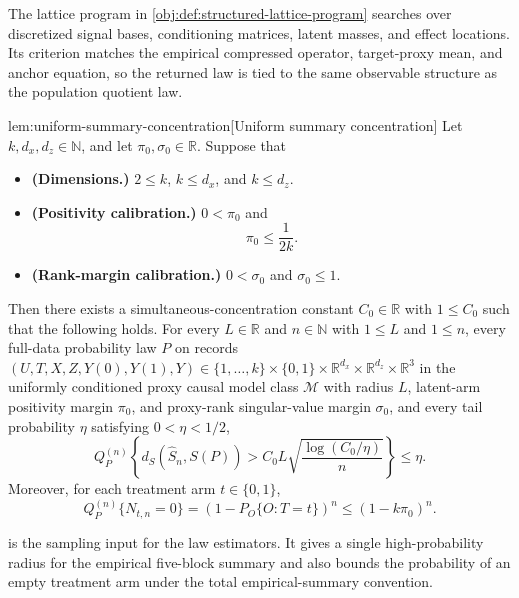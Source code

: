 The lattice program in \cref{obj:def:structured-lattice-program} searches over discretized signal bases, conditioning matrices, latent masses, and effect locations. Its criterion matches the empirical compressed operator, target-proxy mean, and anchor equation, so the returned law is tied to the same observable structure as the population quotient law.

\begin{lemmav}{lem:uniform-summary-concentration}[Uniform summary concentration]
Let \(k,d_x,d_z\in\mathbb N\), and let \(\pi_0,\sigma_0\in\mathbb R\). Suppose that
\begin{itemize}
\item \textbf{(Dimensions.)} \(2\le k\), \(k\le d_x\), and \(k\le d_z\).
\item \textbf{(Positivity calibration.)} \(0<\pi_0\) and
\[
\pi_0\le \frac{1}{2k}.
\]
\item \textbf{(Rank-margin calibration.)} \(0<\sigma_0\) and \(\sigma_0\le 1\).
\end{itemize}
Then there exists a simultaneous-concentration constant \(C_0\in\mathbb R\) with \(1\le C_0\) such that the following holds. For every \(L\in\mathbb R\) and \(n\in\mathbb N\) with \(1\le L\) and \(1\le n\), every full-data probability law \(P\) on records \((U,T,X,Z,Y(0),Y(1),Y)\in \{1,\ldots,k\}\times\{0,1\}\times\mathbb R^{d_x}\times\mathbb R^{d_z}\times\mathbb R^3\) in the uniformly conditioned proxy causal model class \(\mathcal M\) with radius \(L\), latent-arm positivity margin \(\pi_0\), and proxy-rank singular-value margin \(\sigma_0\), and every tail probability \(\eta\) satisfying \(0<\eta<1/2\),
\[
Q_P^{(n)}\left\{d_S(\widehat S_n,S(P))>
C_0L\sqrt{\frac{\log(C_0/\eta)}{n}}\right\}\le \eta .
\]
Moreover, for each treatment arm \(t\in\{0,1\}\),
\[
Q_P^{(n)}\{N_{t,n}=0\}
=
\left(1-P_O\{O:T=t\}\right)^n
\le
(1-k\pi_0)^n .
\]
\end{lemmav}

 is the sampling input for the law estimators. It gives a single high-probability radius for the empirical five-block summary and also bounds the probability of an empty treatment arm under the total empirical-summary convention.

